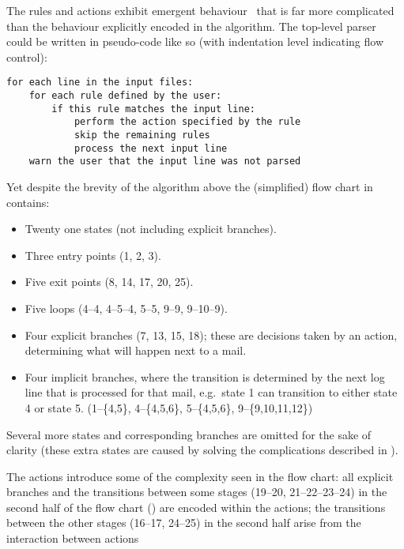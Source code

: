 The rules and actions exhibit emergent behaviour~\cite{Wikipedia-Emergence}
that is far more complicated than the behaviour explicitly encoded in the
algorithm.  The top-level parser could be written in pseudo-code like so
(with indentation level indicating flow control):

\begin{verbatim}
for each line in the input files:
    for each rule defined by the user:
        if this rule matches the input line:
            perform the action specified by the rule
            skip the remaining rules
            process the next input line
    warn the user that the input line was not parsed
\end{verbatim}

Yet despite the brevity of the algorithm above the (simplified) flow chart
in  contains:

\begin{itemize}

    \item Twenty one states (not including explicit branches).

    \item Three entry points (1, 2, 3).

    \item Five exit points (8, 14, 17, 20, 25).

    \item Five loops (4--4, 4--5--4, 5--5, 9--9, 9--10--9).

    \item Four explicit branches (7, 13, 15, 18); these are decisions taken
        by an action, determining what will happen next to a mail.

    \item Four implicit branches, where the transition is determined by the
        next log line that is processed for that mail, e.g.\ state 1 can
        transition to either state 4 or state 5.  (1--\{4,5\},
        4--\{4,5,6\}, 5--\{4,5,6\}, 9--\{9,10,11,12\})

\end{itemize}

Several more states and corresponding branches are omitted for the sake of
clarity (these extra states are caused by solving the complications
described in ).

The actions introduce some of the complexity seen in the flow chart: all
explicit branches and the transitions between some stages (19--20,
21--22--23--24) in the second half of the flow chart
() are encoded within the
actions; the transitions between the other stages (16--17, 24--25) in the
second half arise from the interaction between actions

